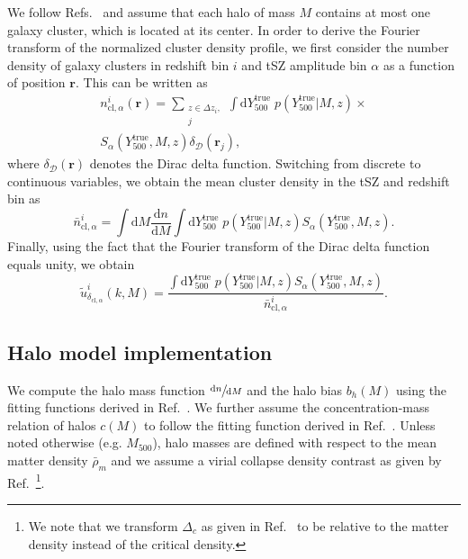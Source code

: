 \documentclass[%
 reprint,
nofootinbib,
 amsmath,amssymb,
 aps,
]{revtex4-1}
\begin{document}
We follow Refs.~\cite{Huetsi:2008, Krause:2017} and assume that each halo of mass $M$ contains at most one galaxy cluster, which is located at its center. In order to derive the Fourier transform of the normalized cluster density profile, we first consider the number density of galaxy clusters in redshift bin $i$ and tSZ amplitude bin $\alpha$ as a function of position $\mathbf{r}$. This can be written as
\begin{equation}
\begin{aligned}
n^{i}_{\mathrm{cl}, \alpha}(\mathbf{r}) = \sum_{\substack{z \in \Delta z_{i},\\ j}} \int \mathrm{d}Y_{500}^{\mathrm{true}}\; p(Y_{500}^{\mathrm{true}}|M, z) \times \\ S_{\alpha}(Y_{500}^{\mathrm{true}}, M, z) \delta_{\mathcal{D}}(\mathbf{r}_{j}),
\end{aligned}
\end{equation}
where $\delta_{\mathcal{D}}(\mathbf{r})$ denotes the Dirac delta function. Switching from discrete to continuous variables, we obtain the mean cluster density in the tSZ and redshift bin as
\begin{equation}
\bar{n}^{i}_{\mathrm{cl}, \alpha} = \int \mathrm{d}M \frac{\mathrm{d}n}{\mathrm{d}M} \int \mathrm{d}Y_{500}^{\mathrm{true}}\; p(Y_{500}^{\mathrm{true}}|M, z) S_{\alpha}(Y_{500}^{\mathrm{true}}, M, z).
\end{equation}
Finally, using the fact that the Fourier transform of the Dirac delta function equals unity, we obtain 
\begin{equation}
\tilde{u}^{i}_{\delta_{\mathrm{cl}, \alpha}}(k, M) = \frac{\int \mathrm{d}Y_{500}^{\mathrm{true}}\; p(Y_{500}^{\mathrm{true}}|M, z) S_{\alpha}(Y_{500}^{\mathrm{true}}, M, z)}{\bar{n}^{i}_{\mathrm{cl}, \alpha}}.
\end{equation}

\subsection{Halo model implementation}

We compute the halo mass function $\sfrac{\mathrm{d}n}{\mathrm{d}M}$ and the halo bias $b_{h}(M)$ using the fitting functions derived in Ref.~\cite{Sheth:1999}. We further assume the concentration-mass relation of halos $c(M)$ to follow the fitting function derived in Ref.~\cite{Duffy:2008}. Unless noted otherwise (e.g. $M_{500}$), halo masses are defined with respect to the mean matter density $\bar{\rho}_{m}$ and we assume a virial collapse density contrast as given by Ref.~\cite{Bryan:1998}\footnote{We note that we transform $\Delta_{c}$ as given in Ref.~\cite{Bryan:1998} to be relative to the matter density instead of the critical density.}.
\end{document}
